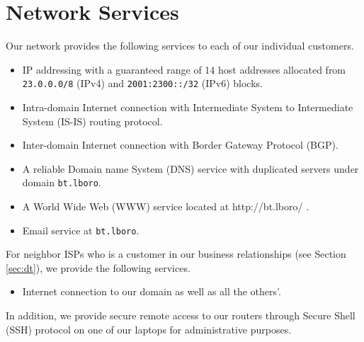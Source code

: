 \section{Network Services}
\label{sec:services}

Our network provides the following services to each of our individual customers.

\begin{itemize}
\item
	IP addressing with a guaranteed range of 14 host addresses allocated from \texttt{23.0.0.0/8} (IPv4) and \texttt{2001:2300::/32} (IPv6) blocks.
\item
	Intra-domain Internet connection with Intermediate System to Intermediate System (IS-IS) routing protocol.
\item
	Inter-domain Internet connection with Border Gateway Protocol (BGP).
\item
	A reliable Domain name System (DNS) service with duplicated servers under domain \texttt{bt.lboro}.
\item
	A World Wide Web (WWW) service located at http://bt.lboro/ .
\item
	Email service at \texttt{bt.lboro}.
\end{itemize}



For neighbor ISPs who is a customer in our business relationships (see Section \ref{sec:dt}), we provide the following services.

\begin{itemize}
\item
	Internet connection to our domain as well as all the others'.
\end{itemize}



In addition, we provide secure remote access to our routers through Secure Shell (SSH) protocol on one of our laptops for administrative purposes.

